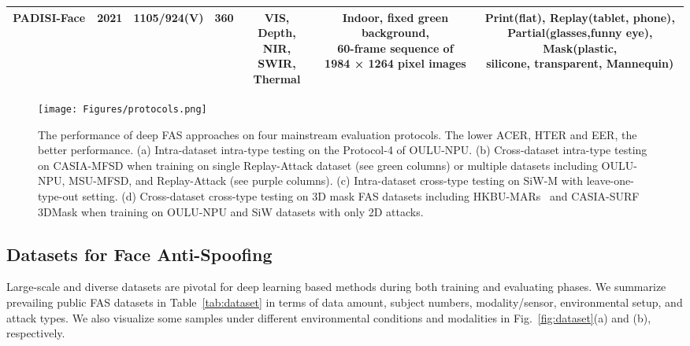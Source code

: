 \documentclass[10pt,journal,compsoc]{IEEEtran}
\begin{document}
\begin{table}
{\begin{tabular}{c c c c c c c}
 \midrule
PADISI-Face
~\cite{rostami2021detection} & 2021 & 1105/924(V) & 360 &  \tabincell{c}{VIS, Depth,\\ NIR, SWIR, \\Thermal}  &  \tabincell{c}{Indoor, fixed green background,  \\60-frame sequence of \\ 1984 × 1264 pixel images}  & \tabincell{c}{Print(flat), Replay(tablet, phone),\\ Partial(glasses,funny eye), Mask(plastic, \\silicone, transparent, Mannequin)}\\




 \bottomrule[1pt]
 \end{tabular}}
\end{table}




\begin{figure}
\centering
\texttt{[image: Figures/protocols.png]}
\vspace{-1.0em}
  \caption{ 
  The performance of deep FAS approaches on four mainstream evaluation protocols. The lower ACER, HTER and EER, the better performance. (a) Intra-dataset intra-type testing on the Protocol-4 of OULU-NPU. (b) Cross-dataset intra-type testing on CASIA-MFSD when training on single Replay-Attack dataset (see green columns) or multiple datasets including OULU-NPU, MSU-MFSD, and Replay-Attack (see purple columns). (c) Intra-dataset cross-type testing on SiW-M with leave-one-type-out setting. (d) Cross-dataset cross-type testing on 3D mask FAS datasets including HKBU-MARs~\cite{liu20163d} and CASIA-SURF 3DMask when training on OULU-NPU and SiW datasets with only 2D attacks. }
\label{fig:protocols}
\end{figure}





\subsection{Datasets for Face Anti-Spoofing}

Large-scale and diverse datasets are pivotal for deep learning based methods during both training and evaluating phases. We summarize prevailing public FAS datasets in Table~\ref{tab:dataset} in terms of data amount, subject numbers, modality/sensor, environmental setup, and attack types. We also visualize some samples under different environmental conditions and modalities in Fig.~\ref{fig:dataset}(a) and (b), respectively. 
\end{document}
